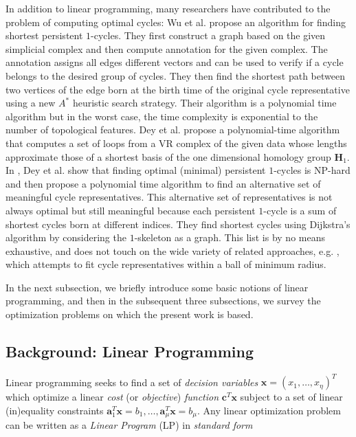 \documentclass[11pt,onecolumn]{article}
\newcommand{\Homologies}[0]{\mathbf{H}}
\theoremstyle{plain}
\theoremstyle{definition}
\begin{document}
In addition to linear programming, many researchers have contributed to the problem of computing optimal cycles: Wu et al. \cite{wu} propose an algorithm for finding shortest persistent $1$-cycles. They first construct a graph based on the given simplicial complex and then compute annotation for the given complex. The annotation assigns all edges different vectors and can be used to verify if a cycle belongs to the desired group of cycles. They then find the shortest path between two vertices of the edge born at the birth time of the original cycle representative using a new $A^*$ heuristic search strategy. Their algorithm is a polynomial time algorithm but in the worst case, the time complexity is exponential to the number of topological features. Dey et al. \cite{shortestonedimension} propose a polynomial-time algorithm that computes a set of loops from a VR complex of the given data whose lengths approximate those of a shortest basis of the one dimensional homology group $\Homologies_1$. In \cite{dey2018}, Dey et al. show that finding optimal (minimal) persistent $1$-cycles is NP-hard and then propose a polynomial time algorithm to find an alternative set of meaningful cycle representatives. This alternative set of representatives is not always optimal but still meaningful because each persistent $1$-cycle is a sum of shortest cycles born at different indices. They find shortest cycles using Dijkstra's algorithm by considering the $1$-skeleton as a graph.   This list is by no means exhaustive, and does not touch on the wide variety of related approaches, e.g. \cite{chenhardness}, which attempts to fit cycle representatives within a ball of minimum radius.



 
 
\label{sec:minimalgenerators}

In the next subsection, we briefly introduce some basic notions of linear programming, and then in the subsequent three subsections, we survey the optimization problems on which the present work is based.

\subsection{Background: Linear Programming}

Linear programming seeks to find a set of \emph{decision variables} $\textbf{x}=(x_1,\ldots,x_\eta)^T$ which optimize a linear \emph{cost} (or \emph{objective}) \emph{function} $\textbf{c}^T\textbf{x}$ subject to a set of linear (in)equality constraints $\textbf{a}_1^T\textbf{x}=b_1, \ldots, \textbf{a}_\mu^T\textbf{x}=b_\mu$. Any linear optimization problem can be written as a \emph{Linear Program} (LP) in \emph{standard form}  
\end{document}
